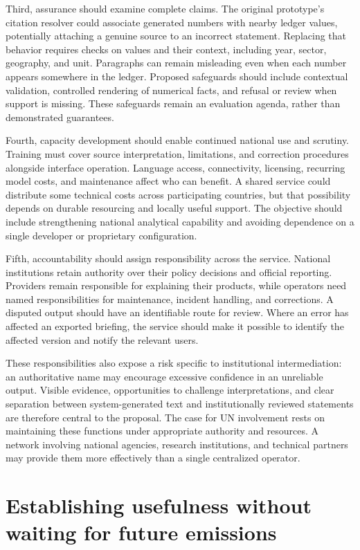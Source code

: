 \documentclass[11pt]{article}
\begin{document}
Third, assurance should examine complete claims. The original prototype's citation resolver could associate generated numbers with nearby ledger values, potentially attaching a genuine source to an incorrect statement. Replacing that behavior requires checks on values and their context, including year, sector, geography, and unit. Paragraphs can remain misleading even when each number appears somewhere in the ledger. Proposed safeguards should include contextual validation, controlled rendering of numerical facts, and refusal or review when support is missing. These safeguards remain an evaluation agenda, rather than demonstrated guarantees.

Fourth, capacity development should enable continued national use and scrutiny. Training must cover source interpretation, limitations, and correction procedures alongside interface operation. Language access, connectivity, licensing, recurring model costs, and maintenance affect who can benefit. A shared service could distribute some technical costs across participating countries, but that possibility depends on durable resourcing and locally useful support. The objective should include strengthening national analytical capability and avoiding dependence on a single developer or proprietary configuration.

Fifth, accountability should assign responsibility across the service. National institutions retain authority over their policy decisions and official reporting. Providers remain responsible for explaining their products, while operators need named responsibilities for maintenance, incident handling, and corrections. A disputed output should have an identifiable route for review. Where an error has affected an exported briefing, the service should make it possible to identify the affected version and notify the relevant users.

These responsibilities also expose a risk specific to institutional intermediation: an authoritative name may encourage excessive confidence in an unreliable output. Visible evidence, opportunities to challenge interpretations, and clear separation between system-generated text and institutionally reviewed statements are therefore central to the proposal. The case for UN involvement rests on maintaining these functions under appropriate authority and resources. A network involving national agencies, research institutions, and technical partners may provide them more effectively than a single centralized operator.

\section*{Establishing usefulness without waiting for future emissions}
\end{document}
